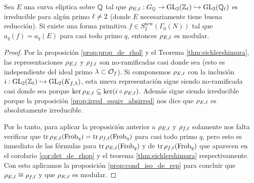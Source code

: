 \begin{cor}\label{cor:modularidad_rhol}
  Sea $E$ una curva el\'iptica sobre $\mathbb{Q}$ tal que $\rho_{E,\ell}:G_{\mathbb{Q}}\rightarrow\mathrm{GL}_2(\mathbb{Z}_\ell)\hookrightarrow\mathrm{GL}_2(\mathbb{Q}_\ell)$ es irreducible para alg\'un primo $\ell\neq2$ (donde $E$ necesariamente tiene buena reducci\'on). Si existe una forma primitiva $f\in S^{\mathrm{new}}_2(\Gamma_0(N))$ tal que $a_q(f)=a_q(E)$ para casi todo primo $q$, entonces $\rho_{E,\ell}$ es modular.
\end{cor}
\begin{proof}
  Por la proposici\'on \ref{prop:prop_de_rhol} y el Teorema \ref{thm:eichlershimura}, las representaciones $\rho_{E,\ell}$ y $\rho_{f,\ell}$ son no-ramificadas casi donde sea (esto es independiente del ideal primo $\lambda\subset\mathcal{O}_f$). Si componemos $\rho_{E,\ell}$ con la inclusi\'on $i:\mathrm{GL}_2(\mathbb{Z}_\ell)\hookrightarrow\mathrm{GL}_2(K_{f,\lambda})$, esta nueva representaci\'on sigue siendo no-ramificada casi donde sea porque $\ker\rho_{E,\ell}\subseteq\ker(i\circ\rho_{E,\ell})$. Adem\'as sigue siendo irreducible porque la proposici\'on \ref{prop:irred_equiv_absirred} nos dice que $\rho_{E,\ell}$ es absolutamente irreducible.
  
  Por lo tanto, para aplicar la proposici\'on anterior a $\rho_{E,\ell}$ y $\rho_{f,\ell}$ solamente nos falta verificar que $\mathrm{tr}\,\rho_{E,\ell}(\mathrm{Frob}_q)=\mathrm{tr}\,\rho_{f,\ell}(\mathrm{Frob}_q)$ para casi todo primo $q$, pero esto es inmediato de las f\'ormulas para $\mathrm{tr}\,\rho_{E,\ell}(\mathrm{Frob}_q)$ y de $\mathrm{tr}\,\rho_{f,\ell}(\mathrm{Frob}_q)$ que aparecen en el corolario \ref{cor:det_de_rhop} y el teorema \ref{thm:eichlershimura} respectivamente. Con esto aplicamos la proposici\'on \ref{prop:cond_iso_de_rep} para concluir que $\rho_{E,\ell}\cong\rho_{f,\ell}$ y que $\rho_{E,\ell}$ es modular.
\end{proof}




